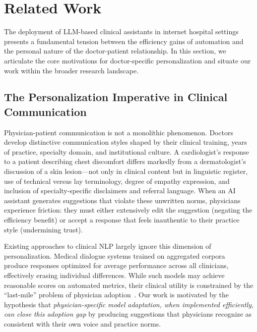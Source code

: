 \section{Related Work}\label{section:motivation}

The deployment of LLM-based clinical assistants in internet hospital settings presents a fundamental tension between the efficiency gains of automation and the personal nature of the doctor-patient relationship. In this section, we articulate the core motivations for doctor-specific personalization and situate our work within the broader research landscape.

\subsection{The Personalization Imperative in Clinical Communication}

Physician-patient communication is not a monolithic phenomenon. Doctors develop distinctive communication styles shaped by their clinical training, years of practice, specialty domain, and institutional culture. A cardiologist's response to a patient describing chest discomfort differs markedly from a dermatologist's discussion of a skin lesion---not only in clinical content but in linguistic register, use of technical versus lay terminology, degree of empathy expression, and inclusion of specialty-specific disclaimers and referral language. When an AI assistant generates suggestions that violate these unwritten norms, physicians experience friction: they must either extensively edit the suggestion (negating the efficiency benefit) or accept a response that feels inauthentic to their practice style (undermining trust).

Existing approaches to clinical NLP largely ignore this dimension of personalization. Medical dialogue systems trained on aggregated corpora~\cite{zengMedDialogLargescaleMedical2020} produce responses optimized for average performance across all clinicians, effectively erasing individual differences. While such models may achieve reasonable scores on automated metrics, their clinical utility is constrained by the ``last-mile'' problem of physician adoption~\cite{info:doi/10.2196/jmir.7854}. Our work is motivated by the hypothesis that \textit{physician-specific model adaptation, when implemented efficiently, can close this adoption gap} by producing suggestions that physicians recognize as consistent with their own voice and practice norms.

